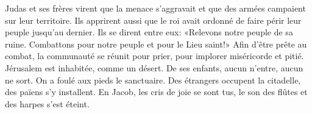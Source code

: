 Judas et ses frères virent que la menace s’aggravait
	et que des armées campaient sur leur territoire.
Ils apprirent aussi que le roi avait ordonné de faire périr leur peuple jusqu’au dernier.
Ils se dirent entre eux: «Relevons notre peuple de sa ruine.
	Combattons pour notre peuple et pour le Lieu saint!»
Afin d’être prête au combat,
	la communauté se réunit pour prier, pour implorer miséricorde et pitié.
Jérusalem est inhabitée, comme un désert.
	De ses enfants, aucun n’entre, aucun ne sort.
	On a foulé aux pieds le sanctuaire.
Des étrangers occupent la citadelle, des païens s’y installent.
	En Jacob, les cris de joie se sont tus, le son des flûtes et des harpes s’est éteint.
